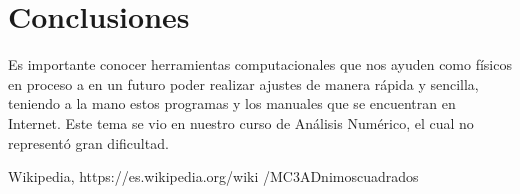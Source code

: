 \documentclass[12 pt,twocolumn]{article}
\begin{document}
\section{\small Conclusiones}
Es importante conocer herramientas computacionales que nos ayuden como físicos en proceso a en un futuro poder realizar ajustes de manera rápida y sencilla, teniendo a la mano estos programas y los manuales que se encuentran en Internet.
Este tema se vio en nuestro curso de Análisis Numérico, el cual no representó gran dificultad.

\begin{thebibliography}{widestlabel}
	 Wikipedia, https://es.wikipedia.org/wiki
	/MC3ADnimoscuadrados
	
	
\end{thebibliography}
\end{document}
